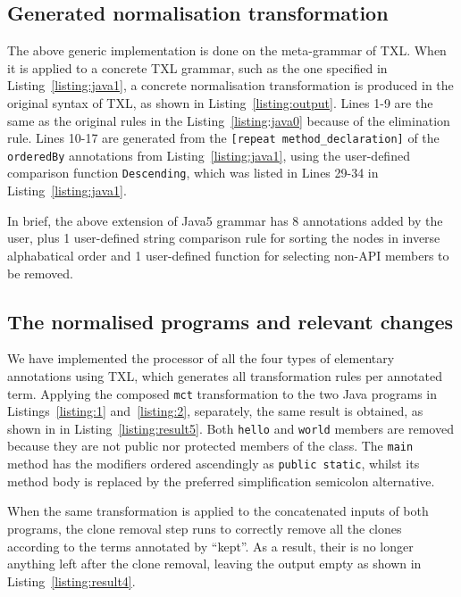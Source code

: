 \documentclass[10pt, conference, compsocconf]{IEEEtran}
\begin{document}
{\subsection{Generated normalisation transformation}
The above generic implementation is done on the meta-grammar of TXL. When it is applied to a concrete TXL grammar, such as the one specified in Listing~\ref{listing:java1}, a concrete normalisation transformation is produced in the original syntax of TXL, as shown in Listing~\ref{listing:output}. Lines 1-9 are the same as the original rules in the Listing~\ref{listing:java0} because of the elimination rule. Lines 10-17 are generated from the {\tt [repeat method\_declaration]} of the {\tt orderedBy} annotations from Listing~\ref{listing:java1}, using the user-defined comparison function {\tt Descending}, which was listed in Lines 29-34 in Listing~\ref{listing:java1}. 


In brief, the above extension of Java5 grammar has 8 annotations added by the user, plus 1 user-defined string comparison rule for sorting the nodes in inverse alphabatical order and 1 user-defined function for selecting non-API members to be removed.
\subsection{The normalised programs and relevant changes}
We have implemented the processor of all the four types of elementary annotations using TXL, which generates all transformation rules per annotated term. Applying the composed {\tt mct}  transformation to the two Java programs in Listings~\ref{listing:1} and~\ref{listing:2}, separately, the same result is obtained, as shown in in Listing~\ref{listing:result5}. Both {\tt hello} and {\tt world} members are removed because they are not public nor protected members of the class. The {\tt main} method has the modifiers ordered ascendingly as {\tt public static}, whilst its method body is replaced by the preferred simplification semicolon alternative. 

When the same transformation is applied to the concatenated inputs of both programs, the clone removal step runs to correctly remove all the clones according to the terms annotated by ``kept''. As a result, their is no longer anything left after the clone removal, leaving the output empty as shown in Listing~\ref{listing:result4}.



}
\end{document}
